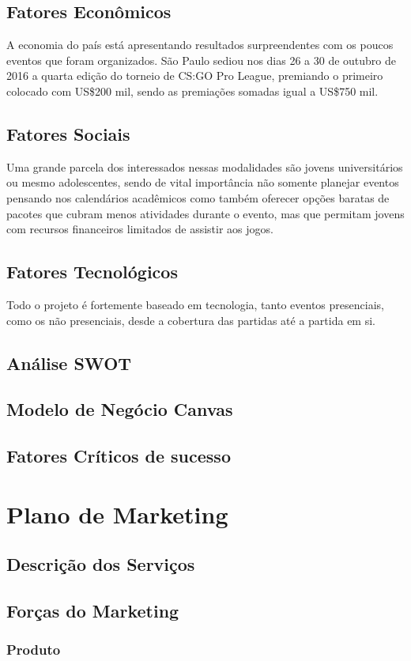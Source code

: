 \documentclass[a4paper, 12pt]{paper}
\begin{document}
\subsection{Fatores Econômicos}
A economia do país está apresentando resultados surpreendentes com os poucos eventos que foram organizados. São Paulo sediou nos dias 26 a 30 de outubro de 2016 a quarta edição do torneio de CS:GO Pro League, premiando o primeiro colocado com US\$200 mil, sendo as premiações somadas igual a US\$750 mil.
\subsection{Fatores Sociais}
Uma grande parcela dos interessados nessas modalidades são jovens universitários ou mesmo adolescentes, sendo de vital importância não somente planejar eventos pensando nos calendários acadêmicos como também oferecer opções baratas de pacotes que cubram menos atividades durante o evento, mas que permitam jovens com recursos financeiros limitados de assistir aos jogos.
\subsection{Fatores Tecnológicos}
Todo o projeto é fortemente baseado em tecnologia, tanto eventos presenciais, como os não presenciais, desde a cobertura das partidas até a partida em si.
\subsection{Análise SWOT}
\subsection{Modelo de Negócio Canvas}
\subsection{Fatores Críticos de sucesso}
\newpage
\section{Plano de Marketing}
\subsection{Descrição dos Serviços}
\subsection{Forças do Marketing}
\subsubsection{Produto}
\end{document}
